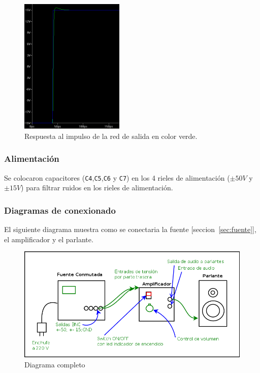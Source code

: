\documentclass[a4paper,12pt,twoside]{article}
\begin{document}
\begin{figure}[H]
\centering
\includegraphics[width=0.44\textwidth]{img/respuesta_zobel}
\caption{Respuesta al impulso de la red de salida en color verde.}
\label{fig:sim_rta_impulso_zobel} 
\end{figure}
 



\subsubsection{Alimentación}

Se colocaron capacitores (\texttt{C4},\texttt{C5},\texttt{C6} y \texttt{C7}) en los 4 rieles de alimentación ($\pm 50V$ y $\pm 15V$) para filtrar ruidos en los rieles de alimentación.


\subsubsection{Diagramas de conexionado}
El siguiente diagrama muestra como se conectaria la fuente [seccion~\ref{sec:fuente}], el amplificador y el parlante.

\begin{figure}[H]
\centering
\includegraphics[width=1\textwidth]{img/integracion/diagrama_completo}
\caption{Diagrama completo}
\label{fig:diag_completo} 
\end{figure}
\end{document}
